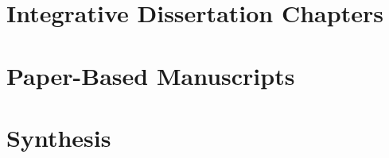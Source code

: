 \documentclass[12pt,oneside]{book}
\begin{document}
\frontmatter




\tableofcontents
\listoffigures
\listoftables

\mainmatter

\part{Integrative Dissertation Chapters}




\part{Paper-Based Manuscripts}




\part{Synthesis}



\appendix



\backmatter


\end{document}
